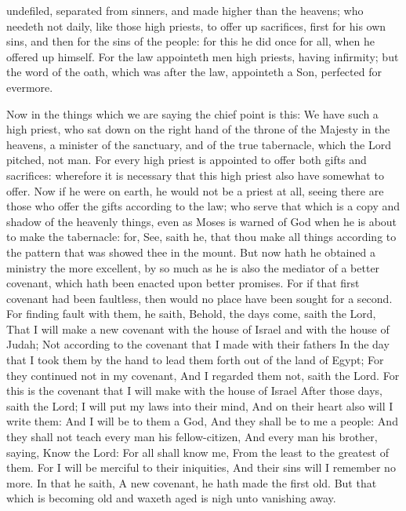 undefiled, separated from sinners, and made higher than the heavens; who needeth not daily, like those high priests, to offer up sacrifices, first for his own sins, and then for the sins of the people: for this he did once for all, when he offered up himself. For the law appointeth men high priests, having infirmity; but the word of the oath, which was after the law, appointeth a Son, perfected for evermore. 

Now in the things which we are saying the chief point is this: We have such a high priest, who sat down on the right hand of the throne of the Majesty in the heavens, a minister of the sanctuary, and of the true tabernacle, which the Lord pitched, not man. For every high priest is appointed to offer both gifts and sacrifices: wherefore it is necessary that this high priest also have somewhat to offer. Now if he were on earth, he would not be a priest at all, seeing there are those who offer the gifts according to the law; who serve that which is a copy and shadow of the heavenly things, even as Moses is warned of God when he is about to make the tabernacle: for, See, saith he, that thou make all things according to the pattern that was showed thee in the mount. But now hath he obtained a ministry the more excellent, by so much as he is also the mediator of a better covenant, which hath been enacted upon better promises. For if that first covenant had been faultless, then would no place have been sought for a second. For finding fault with them, he saith, Behold, the days come, saith the Lord, That I will make a new covenant with the house of Israel and with the house of Judah;  Not according to the covenant that I made with their fathers In the day that I took them by the hand to lead them forth out of the land of Egypt; For they continued not in my covenant, And I regarded them not, saith the Lord.  For this is the covenant that I will make with the house of Israel After those days, saith the Lord; I will put my laws into their mind, And on their heart also will I write them: And I will be to them a God, And they shall be to me a people:  And they shall not teach every man his fellow-citizen, And every man his brother, saying, Know the Lord: For all shall know me, From the least to the greatest of them.  For I will be merciful to their iniquities, And their sins will I remember no more.  In that he saith, A new covenant, he hath made the first old. But that which is becoming old and waxeth aged is nigh unto vanishing away. 

